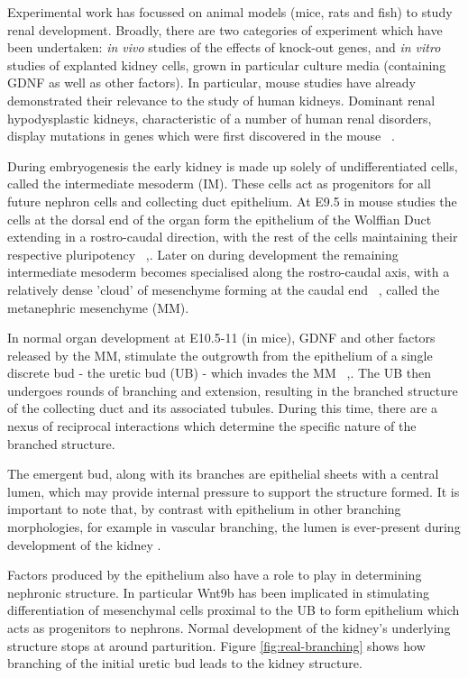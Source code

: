 \documentclass[pdftex,10pt,a4paper,twocolumn]{article}
\begin{document}
Experimental work has focussed on animal models (mice, rats and fish) to study renal development. Broadly, there are two categories of experiment which have been undertaken: \textit{in vivo} studies of the effects of knock-out genes, and \textit{in vitro} studies of explanted kidney cells, grown in particular culture media (containing GDNF as well as other factors). In particular, mouse studies have already demonstrated their relevance to the study of human kidneys. Dominant renal hypodysplastic kidneys, characteristic of a number of human renal disorders, display mutations in genes which were first discovered in the mouse ~\cite{LittleMMcMahon2012}.

During embryogenesis the early kidney is made up solely of undifferentiated cells, called the intermediate mesoderm (IM). These cells act as progenitors for all future nephron cells and collecting duct epithelium. At E9.5 in mouse studies the cells at the dorsal end of the organ form the epithelium of the Wolffian Duct extending in a rostro-caudal direction, with the rest of the cells maintaining their respective pluripotency ~\cite{CostantiniFKopan2010},\cite{saxen1987early}. Later on during development the remaining intermediate mesoderm becomes specialised along the rostro-caudal axis, with a relatively dense 'cloud' of mesenchyme forming at the caudal end ~\cite{CostantiniFKopan2010}, called the metanephric mesenchyme (MM).

In normal organ development at E10.5-11 (in mice), GDNF and other factors released by the MM, stimulate the outgrowth from the epithelium of a single discrete bud - the uretic bud (UB) - which invades the MM ~\cite{CostantiniFKopan2010},\cite{LittleMMcMahon2012}. The UB then undergoes rounds of branching and extension, resulting in the branched structure of the collecting duct and its associated tubules. During this time, there are a nexus of reciprocal interactions which determine the specific nature of the branched structure. 

The emergent bud, along with its branches are epithelial sheets with a central lumen, which may provide internal pressure to support the structure formed. It is important to note that, by contrast with epithelium in other branching morphologies, for example in vascular branching, the lumen is ever-present during development of the kidney \cite{Meyer2004}.

Factors produced by the epithelium also have a role to play in determining nephronic structure. In particular Wnt9b has been implicated in stimulating differentiation of mesenchymal cells proximal to the UB to form epithelium which acts as progenitors to nephrons. Normal development of the kidney's underlying structure stops at around parturition. Figure \ref{fig:real-branching} shows how branching of the initial uretic bud leads to the kidney structure.
\end{document}
